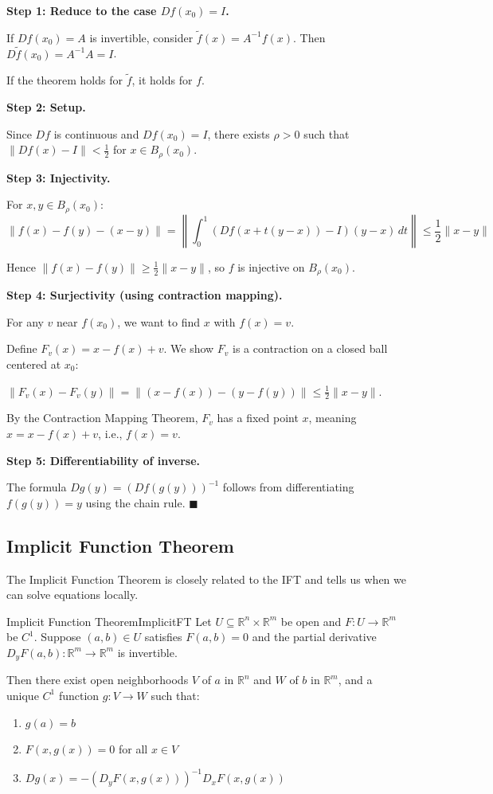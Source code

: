 \documentclass[11pt, letterpaper, openany]{book}
\renewenvironment{proof}[1][\proofname]{%
  \tcolorbox[blanker, breakable, left=1em,
    before skip=1em, after skip=1em,
    borderline west={2pt}{0pt}{MagicTeal!50},
    colback=MagicCream,
    before upper={\textcolor{MagicTeal}{\sffamily\bfseries #1.}\space}
  ]%
}{%
  \hfill\textcolor{MagicTeal}{\ensuremath{\blacksquare}}\endtcolorbox%
}
\begin{document}
\begin{proof}[Sketch]
\textbf{Step 1: Reduce to the case $Df(x_0) = I$.}

If $Df(x_0) = A$ is invertible, consider $\tilde{f}(x) = A^{-1} f(x)$. Then $D\tilde{f}(x_0) = A^{-1} A = I$.

If the theorem holds for $\tilde{f}$, it holds for $f$.

\textbf{Step 2: Setup.}

Since $Df$ is continuous and $Df(x_0) = I$, there exists $\rho > 0$ such that $\|Df(x) - I\| < \frac{1}{2}$ for $x \in B_\rho(x_0)$.

\textbf{Step 3: Injectivity.}

For $x, y \in B_\rho(x_0)$:
\[\|f(x) - f(y) - (x - y)\| = \left\|\int_0^1 (Df(x + t(y-x)) - I)(y - x) \, dt\right\| \leq \frac{1}{2}\|x - y\|\]

Hence $\|f(x) - f(y)\| \geq \frac{1}{2}\|x - y\|$, so $f$ is injective on $B_\rho(x_0)$.

\textbf{Step 4: Surjectivity (using contraction mapping).}

For any $v$ near $f(x_0)$, we want to find $x$ with $f(x) = v$.

Define $F_v(x) = x - f(x) + v$. We show $F_v$ is a contraction on a closed ball centered at $x_0$:

$\|F_v(x) - F_v(y)\| = \|(x - f(x)) - (y - f(y))\| \leq \frac{1}{2}\|x - y\|$.

By the Contraction Mapping Theorem, $F_v$ has a fixed point $x$, meaning $x = x - f(x) + v$, i.e., $f(x) = v$.

\textbf{Step 5: Differentiability of inverse.}

The formula $Dg(y) = (Df(g(y)))^{-1}$ follows from differentiating $f(g(y)) = y$ using the chain rule.
\end{proof}

\subsection{Implicit Function Theorem}

The Implicit Function Theorem is closely related to the IFT and tells us when we can solve equations locally.

\begin{thm}{Implicit Function Theorem}{ImplicitFT}
Let $U \subseteq \mathbb{R}^n \times \mathbb{R}^m$ be open and $F: U \to \mathbb{R}^m$ be $C^1$. Suppose $(a, b) \in U$ satisfies $F(a, b) = 0$ and the partial derivative $D_y F(a, b): \mathbb{R}^m \to \mathbb{R}^m$ is invertible.

Then there exist open neighborhoods $V$ of $a$ in $\mathbb{R}^n$ and $W$ of $b$ in $\mathbb{R}^m$, and a unique $C^1$ function $g: V \to W$ such that:
\begin{enumerate}
    \item $g(a) = b$
    \item $F(x, g(x)) = 0$ for all $x \in V$
    \item $Dg(x) = -(D_y F(x, g(x)))^{-1} D_x F(x, g(x))$
\end{enumerate}
\end{thm}
\end{document}
